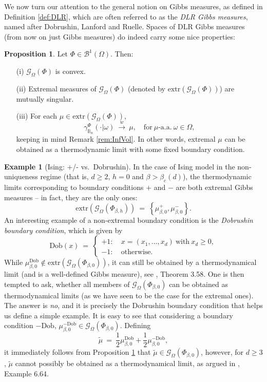 \documentclass[12pt]{article}
\newcommand{\BB}{\mathscr{B}}
\newcommand{\BBB}{\mathbb{B}}
\newcommand{\G}{\mathcal{G}}
\newcommand{\extr}{\mathrm{extr}}
\newcommand{\set}[1]{\left\{#1\right\}}
\newcommand{\pika}{\boldsymbol{\cdot}}
\newcommand{\1}{\mathbbm{1}}
\newcommand{\5}{\vspace{0.5cm}}
\renewcommand{\tilde}{\widetilde}
\theoremstyle{definition}
\newtheorem{ex}[thm]{Example}
\newtheorem{prop}[thm]{Proposition}
\begin{document}
We now turn our attention to the general notion on Gibbs measures, as defined in Definition \ref{def:DLR}, which are often referred to as the \textit{DLR Gibbs measures}, named after Dobrushin, Lanford and Ruelle. Spaces of DLR Gibbs measures (from now on just Gibbs measures) do indeed carry some nice properties:

\begin{prop}\label{DLR:properties}
Let $\Phi\in\BB^1(\Omega)$. Then:
\begin{itemize}
	\item[(i)] $\G_\Omega(\Phi)$ is convex.
	\item[(ii)] Extremal measures of $\G_\Omega(\Phi)$ (denoted by $\extr(\G_\Omega(\Phi))$) are mutually singular.
	\item[(iii)] For each $\mu\in\extr(\G_\Omega(\Phi))$,
	$$\gamma_{\BBB_n}^\Phi(\pika|\omega) ~\xrightarrow{w}~ \mu, \quad \text{for}~\mu\text{-a.a.}~\omega\in\Omega,$$
	keeping in mind Remark \ref{rem:InfVol}. In other words, extremal $\mu$ can be obtained as a thermodynamic limit with some fixed boundary condition.
\end{itemize}
\end{prop}

\begin{ex}[Ising: +/- vs.~Dobrushin]
In the case of Ising model in the non-uniqueness regime (that is, $d\geq 2$, $h=0$ and $\beta>\beta_c(d)$), the thermodynamic limits corresponding to boundary conditions $+$ and $-$ are both extremal Gibbs measures -- in fact, they are the only ones:
$$\mathrm{extr}(\G_\Omega(\Phi_{\beta,h})) ~=~ \set{\mu_{\beta,0}^+,\mu_{\beta,0}^-}.$$
An interesting example of a non-extremal boundary condition is the \textit{Dobrushin boundary condition}, which is given by
$$\mathrm{Dob}(x) ~=~ \begin{cases}
+1: ~&x=(x_1,\ldots,x_d)~\text{with}~x_d\geq 0,\\
-1: ~&\text{otherwise}. 
\end{cases}$$
While $\mu_{\beta,0}^{\mathrm{Dob}}\notin\mathrm{extr}(\G_\Omega(\Phi_{\beta,0}))$, it can still be obtained by a thermodynamical limit (and is a well-defined Gibbs measure), see \cite{FV}, Theorem 3.58. One is then tempted to ask, whether all members of $\G_\Omega(\Phi_{\beta,0})$ can be obtained as thermodynamical limits (as we have seen to be the case for the extremal ones). The answer is \textit{no}, and it is precisely the Dobrushin boundary condition that helps us define a simple example. It is easy to see that considering a boundary condition $-\mathrm{Dob}$, $\mu_{\beta,0}^{-\mathrm{Dob}}\in\G_\Omega(\Phi_{\beta,0})$. Defining
$$\tilde{\mu} ~=~ \frac{1}{2}\mu_{\beta,0}^{\mathrm{Dob}} + \frac{1}{2}\mu_{\beta,0}^{-\mathrm{Dob}},$$
it immediately follows from Proposition \ref{DLR:properties} that $\tilde{\mu}\in\G_{\Omega}(\Phi_{\beta,0})$, however, for $d\geq 3$, $\tilde{\mu}$ cannot possibly be obtained as a thermodynamical limit, as argued in \cite{FV}, Example 6.64.
\end{ex}
\end{document}
